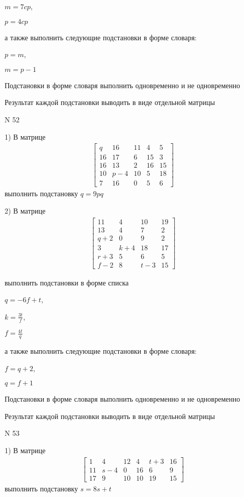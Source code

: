 \documentclass[11pt]{report}
\begin{document}
$m=7 c p$,

$p=4 c p$

а также выполнить следующие подстановки в форме словаря:

$p=m$,

$m=p - 1$


    Подстановки в форме словаря выполнить одновременно и не одновременно


    Результат каждой подстановки выводить в виде отдельной матрицы

\newpage
N 52


    1) В матрице
\begin{align*}
\left[\begin{matrix}q & 16 & 11 & 4 & 5\\16 & 17 & 6 & 15 & 3\\16 & 13 & 2 & 16 & 15\\10 & p - 4 & 10 & 5 & 18\\7 & 16 & 0 & 5 & 6\end{matrix}\right]
\end{align*}
выполнить подстановку $q=9 p q$


    2) В матрице
\begin{align*}
\left[\begin{matrix}11 & 4 & 10 & 19\\13 & 4 & 7 & 2\\q + 2 & 0 & 9 & 2\\3 & k + 4 & 18 & 17\\r + 3 & 5 & 6 & 5\\f - 2 & 8 & t - 3 & 15\end{matrix}\right]
\end{align*}

выполнить подстановки в форме списка

$q=- 6 f + t$,

$k=\frac{3 t}{f}$,

$f=\frac{4 t}{q}$

а также выполнить следующие подстановки в форме словаря:

$f=q + 2$,

$q=f + 1$


    Подстановки в форме словаря выполнить одновременно и не одновременно


    Результат каждой подстановки выводить в виде отдельной матрицы

\newpage
N 53


    1) В матрице
\begin{align*}
\left[\begin{matrix}1 & 4 & 12 & 4 & t + 3 & 16\\11 & s - 4 & 0 & 16 & 6 & 9\\17 & 9 & 10 & 10 & 19 & 15\end{matrix}\right]
\end{align*}
выполнить подстановку $s=8 s + t$
\end{document}
